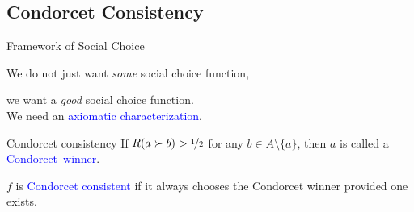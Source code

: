 \documentclass{beamer}
\theoremstyle{definition}
\def\b{\textcolor{blue}}
\def\g#1{{\usebeamercolor[fg]{block title example}{#1}}}
\begin{document}
\subsection{Condorcet Consistency}

\begin{frame}{Framework of Social Choice}
\begin{center}
We do not just want \emph{some} social choice function,\par
we want a \emph{good} social choice function.\pause \\[10pt]
We need an \b{axiomatic characterization}.
\end{center}\pause

\begin{block}{Condorcet consistency}
If $R(a \succ b) > \nicefrac{1}{2}$ for any $b \in A \setminus \{a\}$\pause, then $a$ is called a \b{Condorcet~winner}.\par\pause
$f$ is \b{Condorcet consistent} if it always chooses the Condorcet winner provided one exists.
\end{block}


\end{frame}
\end{document}
